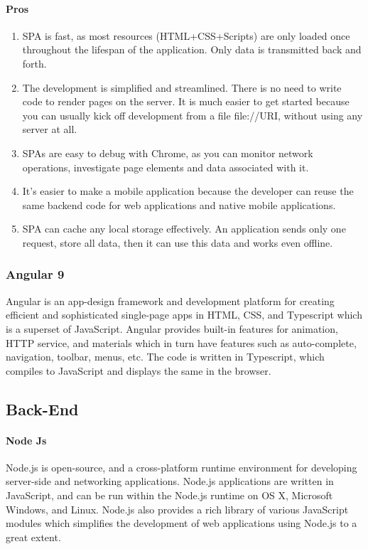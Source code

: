 \paragraph{Pros}
\begin{enumerate}
      \item 
      SPA is fast, as most resources (HTML+CSS+Scripts) are only loaded once throughout the lifespan of the application. Only data is transmitted back and forth.
      \item 
      The development is simplified and streamlined. There is no need to write code to render pages on the server. It is much easier to get started because you can usually kick off development from a file file://URI, without using any server at all.
      \item 
      SPAs are easy to debug with Chrome, as you can monitor network operations, investigate page elements and data associated with it.
      \item 
      It’s easier to make a mobile application because the developer can reuse the same backend code for web applications and native mobile applications.
      \item 
      SPA can cache any local storage effectively. An application sends only one request, store all data, then it can use this data and works even offline.
\end{enumerate}
\subsubsection{Angular 9}
Angular is an app-design framework and development platform for creating efficient and sophisticated single-page apps in \ac{HTML}, \ac{CSS}, and Typescript which is a superset of JavaScript. Angular provides built-in features for animation, \ac{HTTP} service, and materials which in turn have features such as auto-complete, navigation, toolbar, menus, etc. The code is written in Typescript, which compiles to JavaScript and displays the same in the browser.

\subsection{Back-End}

\paragraph{Node Js}
Node.js is open-source, and a cross-platform runtime environment for developing server-side and networking applications. Node.js applications are written in JavaScript, and can be run within the Node.js runtime on OS X, Microsoft Windows, and Linux.
Node.js also provides a rich library of various JavaScript modules which simplifies the development of web applications using Node.js to a great extent.

